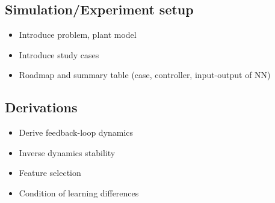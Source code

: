

\subsection{Simulation/Experiment setup}
\begin{itemize}
\color{grey1}
\item Introduce problem, plant model \color{blue}{Fig. Experimental setup illustration}\color{grey1}
\item Introduce study cases
\item Roadmap and summary table (case, controller, input-output of NN)
\end{itemize}

\subsection{Derivations}
\begin{itemize}
\color{grey1}
\item Derive feedback-loop dynamics
\item Inverse dynamics stability
\item Feature selection
\item Condition of learning differences
\end{itemize}

